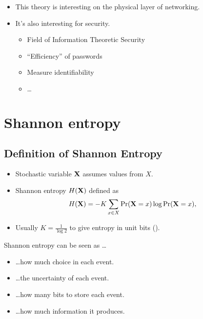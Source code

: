 \begin{frame}
  \begin{itemize}
    \item This theory is interesting on the physical layer of networking.

      \pause{}

    \item It's also interesting for security.
      \begin{itemize}
        \item Field of Information Theoretic Security
        \item \enquote{Efficiency} of passwords
        \item Measure identifiability
        \item \dots
      \end{itemize}
  \end{itemize}
\end{frame}


\section{Shannon entropy}

\subsection{Definition of Shannon Entropy}

\begin{frame}
  \begin{definition}
    \begin{itemize}
      \item Stochastic variable \(\mathbf X\) assumes values from \(X\).
      \item Shannon entropy \(H(\mathbf X)\) defined as
        \begin{align*}
          H(\mathbf X) = -K \sum_{x\in X} \Pr(\mathbf X = x)\log \Pr(\mathbf X = x),
        \end{align*}
      \item Usually \(K = \frac{1}{\log 2}\) to give entropy in unit bits  
        (\si{\bit}).
    \end{itemize}
  \end{definition}
\end{frame}

\begin{frame}
  \begin{block}{Shannon entropy can be seen as \dots}
    \begin{itemize}
      \item \dots how much choice in each event.

      \item \dots the uncertainty of each event.

      \item \dots how many bits to store each event.

      \item \dots how much information it produces.

    \end{itemize}
  \end{block}
\end{frame}

